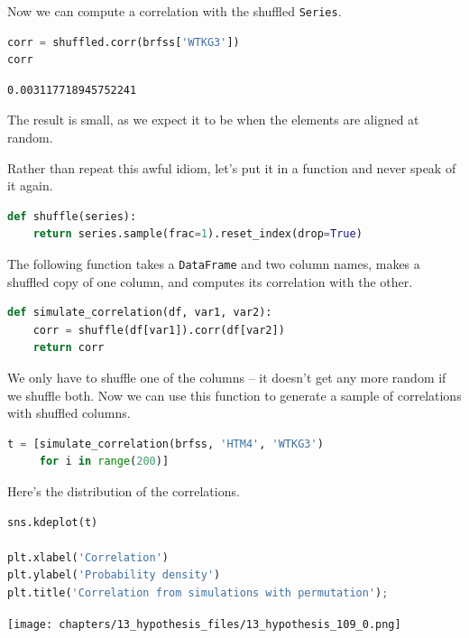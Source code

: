 Now we can compute a correlation with the shuffled
\passthrough{\lstinline!Series!}.

\begin{lstlisting}[language=Python,style=source]
corr = shuffled.corr(brfss['WTKG3'])
corr
\end{lstlisting}

\begin{lstlisting}[style=output]
0.003117718945752241
\end{lstlisting}

The result is small, as we expect it to be when the elements are aligned
at random.

Rather than repeat this awful idiom, let's put it in a function and
never speak of it again.

\begin{lstlisting}[language=Python,style=source]
def shuffle(series):
    return series.sample(frac=1).reset_index(drop=True)
\end{lstlisting}

The following function takes a \passthrough{\lstinline!DataFrame!} and
two column names, makes a shuffled copy of one column, and computes its
correlation with the other.

\begin{lstlisting}[language=Python,style=source]
def simulate_correlation(df, var1, var2):
    corr = shuffle(df[var1]).corr(df[var2])
    return corr
\end{lstlisting}

We only have to shuffle one of the columns -- it doesn't get any more
random if we shuffle both. Now we can use this function to generate a
sample of correlations with shuffled columns.

\begin{lstlisting}[language=Python,style=source]
t = [simulate_correlation(brfss, 'HTM4', 'WTKG3')
     for i in range(200)]
\end{lstlisting}

Here's the distribution of the correlations.

\begin{lstlisting}[language=Python,style=source]
sns.kdeplot(t)

plt.xlabel('Correlation')
plt.ylabel('Probability density')
plt.title('Correlation from simulations with permutation');
\end{lstlisting}

\begin{center}
\texttt{[image: chapters/13\_hypothesis\_files/13\_hypothesis\_109\_0.png]}
\end{center}

